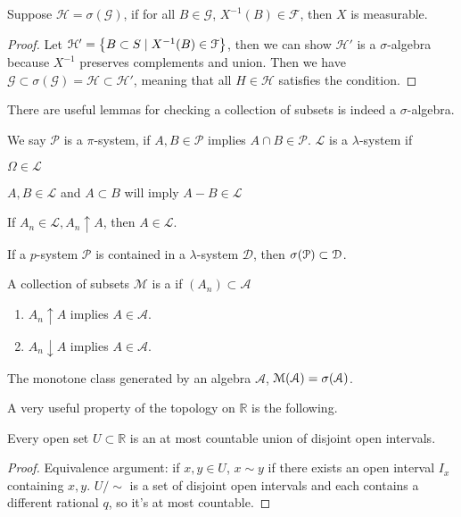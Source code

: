 \begin{lemma}
    Suppose \(\mathcal{H} = \sigma(\mathcal{G})\), if for all \(B \in \mathcal{G}\), \(X^{-1} (B) \in \mathcal{F}\), then \(X \) is measurable. 
\end{lemma}
\begin{proof}
    Let \(\mathcal{H}' = \Bqty{B\subset S\mid X^{-1}(B) \in \mathcal{F}}\), then we can show \(\mathcal{H}'\) is a \(\sigma\)-algebra because \(X^{-1}\) preserves complements and union. Then we have \(\mathcal{G} \subset \sigma(\mathcal{G}) = \mathcal{H} \subset \mathcal{H}'\), meaning that all \(H\in \mathcal{H}\) satisfies the condition.
\end{proof}

There are useful lemmas for checking a collection of subsets is indeed a \(\sigma\)-algebra. 

We say \(\mathcal{P}\) is a \(\pi\)-system, if \(A,B\in \mathcal{P}\) implies \(A\cap B \in \mathcal{P}\). \(\mathcal{L}\) is a \(\lambda\)-system if \begin{enumerate*} 
    \item \(\Omega\in \mathcal{L}\)
    \item \(A,B \in \mathcal{L}\) and \(A\subset B\) will imply \(A - B \in \mathcal{L}\)
    \item If \(A_{n}\in \mathcal{L}, A_{n}\uparrow A\), then \(A\in \mathcal{L}\).
\end{enumerate*} 

\begin{lemma}
    If a \(p\)-system \(\mathcal{P}\) is contained in a \(\lambda\)-system \(\mathcal{D}\), then \(\sigma\pqty{\mathcal{P}} \subset \mathcal{D}\).
\end{lemma}

\begin{lemma}
    A collection of subsets \(\mathcal{M}\) is a   if \((A_{n})\subset \mathcal{A}\)
    \begin{enumerate}
        \item \(A_{n} \uparrow A\) implies \(A \in \mathcal{A}\).
        \item \(A_{n} \downarrow A\) implies \(A \in \mathcal{A}\). 
    \end{enumerate}
    The monotone class generated by an algebra \(\mathcal{A}\), \(\mathcal{M}(\mathcal{A}) = \sigma\pqty{\mathcal{A}}\). 
\end{lemma}

A very useful property of the topology on \(\mathbb{R}\) is the following. 
\begin{thm}
    Every open set \(U \subset \mathbb{R}\) is an at most countable union of disjoint open intervals. 
\end{thm}
\begin{proof}
    Equivalence argument: if \(x,y \in U\), \(x \sim y\) if there exists an open interval \(I_{x}\) containing \(x,y\). \(U / \sim\) is a set of disjoint open intervals and each contains a different rational \(q\), so it's at most countable. 
\end{proof}

